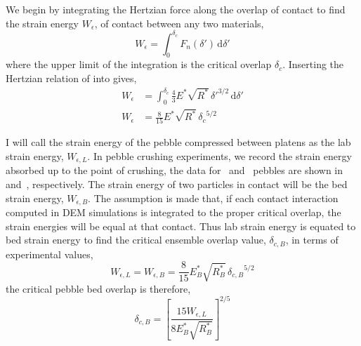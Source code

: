 We begin by integrating the Hertzian force along the overlap of contact to find the strain energy $W_\epsilon$, of contact between any two materials,
\begin{equation}\label{eq:strain-energy-integral}
	W_\epsilon = \int_0^{\delta_c}\!F_n(\delta')\,\mathrm{d}\delta'
\end{equation}
where the upper limit of the integration is the critical overlap $\delta_c$. Inserting the Hertzian relation of  into  gives,
\begin{align}
	W_\epsilon& = \int_0^{\delta_c}\!  \frac{4}{3}E^*\sqrt{R^*}\,\delta'^{3/2} \,\mathrm{d}\delta' \\
	W_\epsilon & = \frac{8}{15}E^*\sqrt{R^*}\, {\delta_c}^{5/2}
\end{align}

I will call the strain energy of the pebble compressed between platens as the lab strain energy, $W_{\epsilon,L}$. In pebble crushing experiments, we record the strain energy absorbed up to the point of crushing, the data for \lis~and \lit~pebbles are shown in  and~, respectively. The strain energy of two particles in contact will be the bed strain energy, $W_{\epsilon,B}$. The assumption is made that, if each contact interaction computed in DEM simulations is integrated to the proper critical overlap, the strain energies will be equal at that contact. Thus lab strain energy is equated to bed strain energy to find the critical ensemble overlap value, $\delta_{c,B}$, in terms of experimental values,
\begin{equation}
	W_{\epsilon,L} = W_{\epsilon,B} = \frac{8}{15}E_B^*\sqrt{R_B^*}\, {\delta_{c,B}}^{5/2}
\end{equation}
the critical pebble bed overlap is therefore,
\begin{equation}
	\delta_{c,B} = \left[\frac{15W_{\epsilon,L}}{8E_B^*\sqrt{R_B^*}}\right]^{2/5}
\end{equation}

